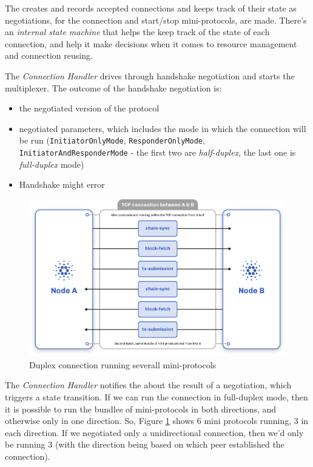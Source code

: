 The \Connmngr{} creates and records accepted connections and keeps track of their state
as negotiations, for the connection and start/stop mini-protocols, are made. There's an
\emph{internal state machine} that helps the \Connmngr{} keep track of the state of each
connection, and help it make decisions when it comes to resource management and
connection reusing.

The \emph{Connection Handler} drives through handshake negotiation and starts the multiplexer. The
outcome of the handshake negotiation is:

\begin{itemize}
    \item the negotiated version of the protocol
    \item negotiated parameters, which includes the mode in which the connection will be
      run (\texttt{InitiatorOnlyMode}, \texttt{ResponderOnlyMode},\\
      \texttt{InitiatorAndResponderMode} - the first two are \emph{half-duplex}, the last
      one is \emph{full-duplex} mode)
    \item Handshake might error
\end{itemize}

\begin{figure}
    \centering
    \includegraphics[width=\linewidth]{figure/node-to-node-ipc.png}
    \caption{Duplex connection running severall mini-protocols}
    \label{fig:protocol-diagram}
\end{figure}

The \emph{Connection Handler} notifies the \Connmngr{} about the result of a negotiation, which
triggers a state transition. If we can run the connection in full-duplex mode,
then it is possible to run the bundles of mini-protocols in both directions, and otherwise only in one direction.
So, Figure \ref{fig:protocol-diagram} shows $6$ mini protocols running, $3$ in each direction.
If we negotiated only a unidirectional connection, then we'd only be running $3$
(with the direction being based on which peer established the connection).

